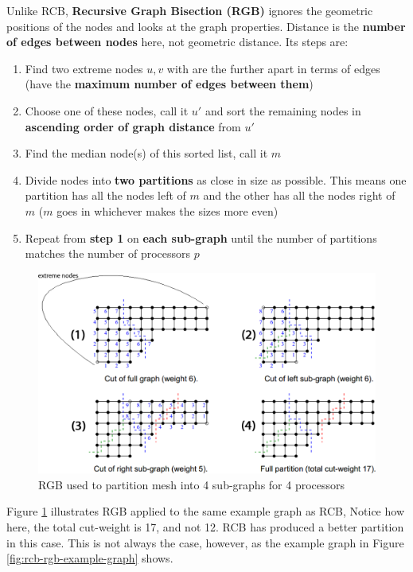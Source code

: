 \documentclass{article}
\begin{document}
Unlike RCB, \textbf{Recursive Graph Bisection (RGB)} ignores the geometric positions of the nodes and looks at the graph properties. Distance is the \textbf{number of edges between nodes} here, not geometric distance. Its steps are:
\begin{enumerate}
	\item Find two extreme nodes $u,v$ with are the further apart in terms of edges (have the \textbf{maximum number of edges between them})
	\item Choose one of these nodes, call it $u'$ and sort the remaining nodes in \textbf{ascending order of graph distance} from $u'$
	\item Find the median node(s) of this sorted list, call it $m$
	\item Divide nodes into \textbf{two partitions} as close in size as possible. This means one partition has all the nodes left of $m$ and the other has all the nodes right of $m$ ($m$ goes in whichever makes the sizes more even)
	\item Repeat from \textbf{step 1} on \textbf{each sub-graph} until the number of partitions matches the number of processors $p$
\end{enumerate}

\begin{figure}
	\centering
	\includegraphics[scale=0.35]{figures/rgb-example.png}
	\caption{RGB used to partition mesh into 4 sub-graphs for 4 processors}
	\label{fig:rgb-example}
\end{figure}

Figure \ref{fig:rgb-example} illustrates RGB applied to the same example graph as RCB, Notice how here, the total cut-weight is 17, and not 12. RCB has produced a better partition in this case. This is not always the case, however, as the example graph in Figure \ref{fig:rcb-rgb-example-graph} shows.
\end{document}
